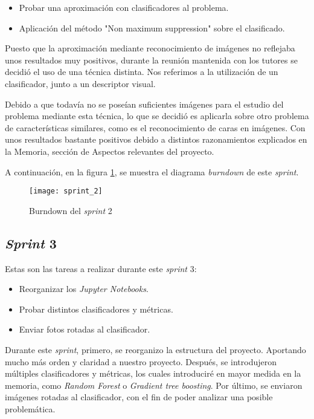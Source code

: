 \begin{itemize}
	\item Probar una aproximación con clasificadores al problema.
	\item Aplicación del método "Non maximum suppression" sobre el clasificado.
\end{itemize}

Puesto que la aproximación mediante reconocimiento de imágenes no reflejaba unos resultados muy positivos, durante la reunión mantenida con los tutores se decidió el uso de una técnica distinta. Nos referimos a la utilización  de un clasificador, junto a un descriptor visual.

Debido a que todavía no se poseían suficientes imágenes para el estudio del problema mediante esta técnica, lo que se decidió es aplicarla sobre otro problema de características similares, como es el reconocimiento de caras en imágenes. Con unos resultados bastante positivos debido a distintos razonamientos explicados en la Memoria, sección de Aspectos relevantes del proyecto.

A continuación, en la figura \ref{fig:A.1.3}, se muestra el diagrama \textit{burndown} de este \textit{sprint}.

\begin{figure}
\centering
\texttt{[image: sprint\_2]}
\caption{Burndown del \textit{sprint} 2}
\label{fig:A.1.3}
\end{figure}

\subsection{\textit{Sprint} 3}
Estas son las tareas a realizar durante este \textit{sprint} 3:

\begin{itemize}
	\item Reorganizar los \textit{Jupyter Notebooks}.
	\item Probar distintos clasificadores y métricas.
	\item Enviar fotos rotadas al clasificador.
\end{itemize}

Durante este \textit{sprint}, primero, se reorganizo la estructura del proyecto. Aportando mucho más orden y claridad a nuestro proyecto. Después, se introdujeron múltiples clasificadores y métricas, los cuales introduciré en mayor medida en la memoria, como \textit{Random Forest} o \textit{Gradient tree boosting}. Por último, se enviaron imágenes rotadas al clasificador, con el fin de poder analizar una posible problemática.

